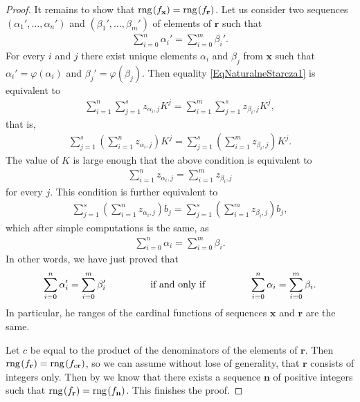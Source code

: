 \documentclass{amsart}
\theoremstyle{definition}
\newcommand{\rng}{{\rm rng} \hspace{0.03cm}}
\begin{document}
\begin{proof}
It remains to show that $\rng (f_{\mathbf{x}})=\rng(f_{\mathbf{r}})$. Let us consider two sequences $(\alpha_{1}',\ldots ,\alpha_{n}')$ and $(\beta_{1}',\ldots ,\beta_{m}')$ of elements of $\mathbf{r}$ such that
\begin{align}\label{EqNaturalneStarcza1}
\sum_{i=0}^{n}\alpha_{i}' = \sum_{i=0}^{m}\beta_{i}'.
\end{align}
For every $i$ and $j$ there exist unique elements $\alpha_{i}$ and $\beta_{j}$ from $\mathbf{x}$ such that $\alpha_{i}' = \varphi (\alpha_{i})$ and $\beta_{j}'=\varphi (\beta_{j})$. Then equality \eqref{EqNaturalneStarcza1} is equivalent to
\begin{align*}
\sum_{i=1}^{n}\sum_{j=1}^{s}z_{\alpha_{i},j} K^{j} = \sum_{i=1}^{m}\sum_{j=1}^{s}z_{\beta_{i},j} K^{j},
\end{align*}
that is,
\begin{align*}
\sum_{j=1}^{s}\left( \sum_{i=1}^{n} z_{\alpha_{i},j}\right) K^{j} = \sum_{j=1}^{s} \left( \sum_{i=1}^{m} z_{\beta_{i},j} \right) K^{j}.
\end{align*}
The value of $K$ is large enough that the above condition is equivalent to
\begin{align*}
\sum_{i=1}^{n} z_{\alpha_{i},j} = \sum_{i=1}^{m} z_{\beta_{i},j}
\end{align*}
for every $j$. This condition is further equivalent to
\begin{align*}
\sum_{j=1}^{s}\left( \sum_{i=1}^{n} z_{\alpha_{i},j}\right) b_{j} = \sum_{j=1}^{s} \left( \sum_{i=1}^{m} z_{\beta_{i},j} \right) b_{j},
\end{align*}
which after simple computations is the same, as
\begin{align*}
\sum_{i=0}^{n}\alpha_{i} = \sum_{i=0}^{m}\beta_{i}.
\end{align*}
In other words, we have just proved that
\begin{align*}
\sum_{i=0}^{n}\alpha_{i}' = \sum_{i=0}^{m}\beta_{i}' \hspace{1.5cm} \textrm{ if and only if } \hspace{1.5cm} \sum_{i=0}^{n}\alpha_{i} = \sum_{i=0}^{m}\beta_{i}.
\end{align*}
In particular, he ranges of the cardinal functions of sequences $\mathbf{x}$ and $\mathbf{r}$ are the same. 

Let $c$ be equal to the product of the denominators of the elements of $\mathbf{r}$. Then $\rng (f_{\mathbf{r}}) = \rng (f_{c\mathbf{r}})$, so we can assume without lose of generality, that $\mathbf{r}$ consists of integers only. Then by \cite[Section 2]{cardfun} we know that there exists a sequence $\mathbf{n}$ of positive integers such that $\rng (f_{\mathbf{r}}) = \rng (f_{\mathbf{n}})$. This finishes the proof.


\end{proof}
\end{document}
